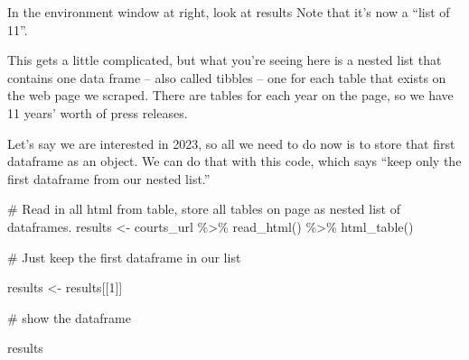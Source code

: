 \documentclass[
  letterpaper,
  DIV=11,
  numbers=noendperiod]{scrreprt}
\newenvironment{Shaded}{\begin{snugshade}}{\end{snugshade}}
\newcommand{\CommentTok}[1]{\textcolor[rgb]{0.37,0.37,0.37}{#1}}
\newcommand{\DecValTok}[1]{\textcolor[rgb]{0.68,0.00,0.00}{#1}}
\newcommand{\FunctionTok}[1]{\textcolor[rgb]{0.28,0.35,0.67}{#1}}
\newcommand{\NormalTok}[1]{\textcolor[rgb]{0.00,0.23,0.31}{#1}}
\newcommand{\OtherTok}[1]{\textcolor[rgb]{0.00,0.23,0.31}{#1}}
\newcommand{\SpecialCharTok}[1]{\textcolor[rgb]{0.37,0.37,0.37}{#1}}
\begin{document}
In the environment window at right, look at results Note that it's now a
``list of 11''.

This gets a little complicated, but what you're seeing here is a nested
list that contains one data frame -- also called tibbles -- one for each
table that exists on the web page we scraped. There are tables for each
year on the page, so we have 11 years' worth of press releases.

Let's say we are interested in 2023, so all we need to do now is to
store that first dataframe as an object. We can do that with this code,
which says ``keep only the first dataframe from our nested list.''

\begin{Shaded}
\begin{Highlighting}[]
\CommentTok{\# Read in all html from table, store all tables on page as nested list of dataframes.}
\NormalTok{results }\OtherTok{\textless{}{-}}\NormalTok{ courts\_url }\SpecialCharTok{\%\textgreater{}\%}
  \FunctionTok{read\_html}\NormalTok{() }\SpecialCharTok{\%\textgreater{}\%}
  \FunctionTok{html\_table}\NormalTok{()}

\CommentTok{\# Just keep the first dataframe in our list}

\NormalTok{results }\OtherTok{\textless{}{-}}\NormalTok{ results[[}\DecValTok{1}\NormalTok{]]}

\CommentTok{\# show the dataframe}

\NormalTok{results}
\end{Highlighting}
\end{Shaded}
\end{document}
